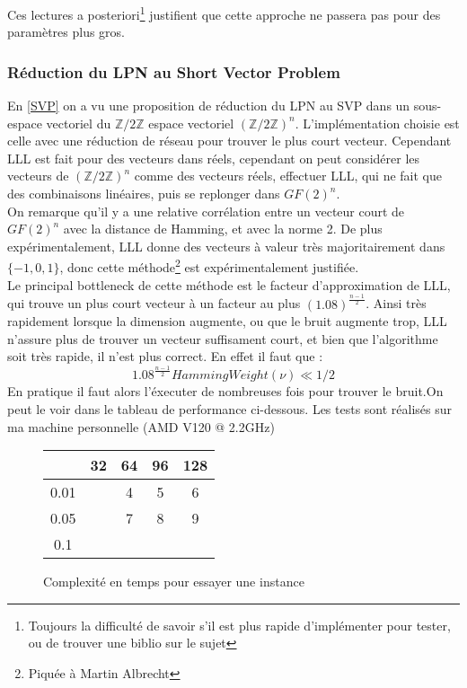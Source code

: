 \documentclass{article}		%
\theoremstyle{definition}
\theoremstyle{plain}
\theoremstyle{plain}
\theoremstyle{plain}
\theoremstyle{plain}
\theoremstyle{plain}
\begin{document}
Ces lectures a posteriori\footnote{Toujours la difficulté de savoir s'il
est plus rapide d'implémenter pour tester, ou de trouver une biblio sur
le sujet} justifient que cette approche ne passera pas pour
des paramètres plus gros. 

\subsubsection{Réduction du LPN au Short Vector Problem}\label{Impsvp}
En \ref{SVP} on a vu une proposition de réduction du LPN au SVP dans un
sous-espace vectoriel du $\mathbb{Z}/2\mathbb{Z}$ espace vectoriel
$(\mathbb{Z}/2\mathbb{Z})^n$. L'implémentation choisie est celle avec une
réduction de réseau pour trouver le plus court vecteur. Cependant LLL
est fait pour des vecteurs dans réels, cependant on peut considérer les
vecteurs de $(\mathbb{Z}/2\mathbb{Z})^n$ comme des vecteurs réels,
effectuer LLL, qui ne fait que des combinaisons linéaires, puis se
replonger dans $GF(2)^n$.
\\ 
On remarque qu'il y a une relative corrélation entre un vecteur court de
$GF(2)^n$ avec la distance de Hamming, et avec la norme 2. De plus
expérimentalement, LLL donne des vecteurs à valeur très majoritairement
dans $\{-1,0,1\}$, donc cette méthode\footnote{Piquée à Martin Albrecht}
est expérimentalement justifiée.
\\
Le principal bottleneck de cette méthode est le facteur d'approximation
de LLL, qui trouve un plus court vecteur à un facteur au plus 
$(1.08)^{\frac {n-1} {2}}$. Ainsi très rapidement lorsque la
dimension augmente, ou que le bruit augmente trop, LLL n'assure plus
de trouver
un vecteur suffisament court, et bien que l'algorithme soit
très rapide, il n'est plus correct.
En effet il faut que : $$1.08^{\frac {n-1} {2}}HammingWeight(\nu)\ll1/2
$$ 
 En pratique il faut alors l'éxecuter
de nombreuses fois pour trouver le bruit.On 
peut le voir dans le tableau de performance ci-dessous. Les tests sont
réalisés sur ma machine personnelle (AMD V120 @ 2.2GHz)
\\
\begin{figure}
\caption{Complexité en temps pour essayer une instance}
\begin{center}
\begin{tabular}{|c |c | c | c | c | }
\hline
   & 32 & 64 & 96 & 128 \\
\hline
 0.01  & &4 & 5 & 6 \\
\hline
  0.05 & &7 & 8 & 9 \\
\hline
 0.1& & & &\\
 \hline
 \end{tabular}
\end{center}
\end{figure}
\end{document}
